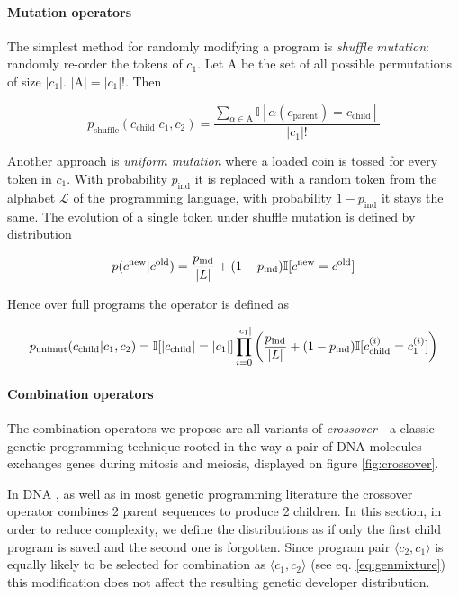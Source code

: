 \paragraph{Mutation operators}

The simplest method for randomly modifying a program is \emph{shuffle mutation}: randomly re-order the tokens of $c_1$.
Let $\mathrm{A}$ be the set of all possible permutations of size $|c_1|$. $|\mathrm{A}|=|c_1|!$. 
Then

\begin{equation}
    p_\text{shuffle}(c_\text{child}|c_1,c_2) =
            \frac{\sum\limits_{\alpha \in \mathrm{A}} \mathbb{I}[\alpha(c_\text{parent}) = c_\text{child}]}{|c_1|!}
\end{equation}

Another approach is \emph{uniform mutation} where a loaded coin is tossed for every token in $c_1$. 
With probability $p_\text{ind}$ it is replaced with a random token from the alphabet $\mathcal{L}$ of the programming language, with probability $1-p_\text{ind}$ it stays the same.
The evolution of a single token under shuffle mutation is defined by distribution

\begin{equation}
    p(c^\text{new} | c^\text{old}) = \frac{p_\text{ind}}{|L|} +  (1 - p_\text{ind}) \mathbb{I}[c^\text{new} = c^\text{old}]
\end{equation}

Hence over full programs the operator is defined as

\begin{equation}
    p_\text{unimut}(c_\text{child}|c_1,c_2) = \mathbb{I}[|c_\text{child}|=|c_1|] \\ 
    \prod\limits_{i=0}^{|c_1|}  \left(\frac{p_\text{ind}}{|L|} +  (1 - p_\text{ind}) \mathbb{I}[c_\text{child}^{(i)} = c_1^{(i)}] \right)
\end{equation}

\paragraph{Combination operators}

The combination operators we propose are all variants of \emph{crossover} - a classic genetic programming technique rooted in the way a pair of DNA molecules exchanges genes during mitosis and meiosis, displayed on figure \ref{fig:crossover}.

In DNA \cite{evocritique}, as well as in most genetic programming literature \cite{genprog1,genprog2} the crossover operator combines 2 parent sequences to produce 2 children.
In this section, in order to reduce complexity, we define the distributions as if only the first child program is saved and the second one is forgotten.
Since program pair $\langle c_2, c_1 \rangle$ is equally likely to be selected for combination as $\langle c_1, c_2 \rangle$ (see eq. \ref{eq:genmixture}) this modification does not affect the resulting genetic developer distribution.

